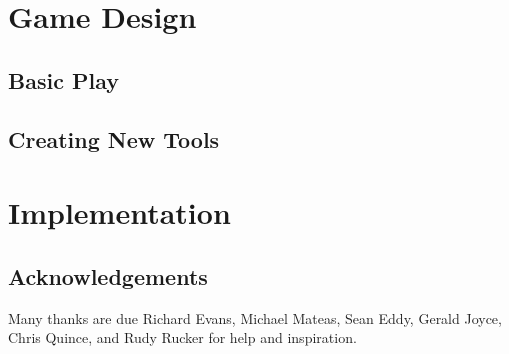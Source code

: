 \documentclass{acm_proc_article-sp}
\begin{document}
\section{Game Design}

\subsection{Basic Play}

\subsection{Creating New Tools}

\section{Implementation}

\subsection{Acknowledgements}

Many thanks are due Richard Evans, Michael Mateas, Sean Eddy, Gerald Joyce, Chris Quince,
and Rudy Rucker for help and inspiration.




\balancecolumns
\end{document}
